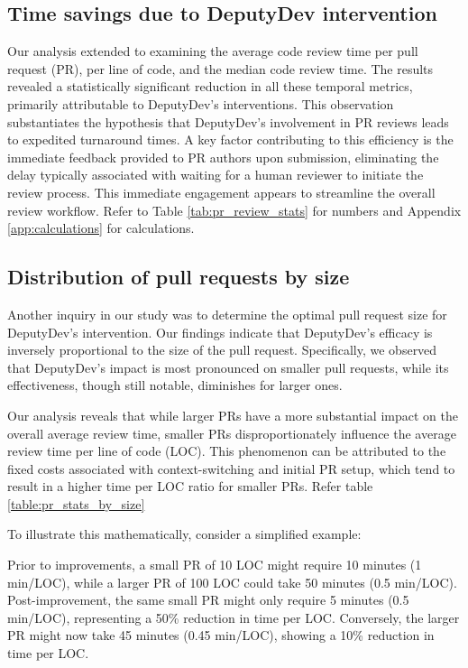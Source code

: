 \subsection{Time savings due to DeputyDev intervention}
Our analysis extended to examining the average code review time per pull request (PR), per line of code, and the median code review time. The results revealed a statistically significant reduction in all these temporal metrics, primarily attributable to DeputyDev's interventions. This observation substantiates the hypothesis that DeputyDev's involvement in PR reviews leads to expedited turnaround times. A key factor contributing to this efficiency is the immediate feedback provided to PR authors upon submission, eliminating the delay typically associated with waiting for a human reviewer to initiate the review process. This immediate engagement appears to streamline the overall review workflow. Refer to Table \ref{tab:pr_review_stats} for numbers and Appendix \ref{app:calculations} for calculations.






\subsection{Distribution of pull requests by size}
Another inquiry in our study was to determine the optimal pull request size for DeputyDev's intervention. Our findings indicate that DeputyDev's efficacy is inversely proportional to the size of the pull request. Specifically, we observed that DeputyDev's impact is most pronounced on smaller pull requests, while its effectiveness, though still notable, diminishes for larger ones.

Our analysis reveals that while larger PRs have a more substantial impact on the overall average review time, smaller PRs disproportionately influence the average review time per line of code (LOC). This phenomenon can be attributed to the fixed costs associated with context-switching and initial PR setup, which tend to result in a higher time per LOC ratio for smaller PRs. Refer table \ref{table:pr_stats_by_size}

To illustrate this mathematically, consider a simplified example:

Prior to improvements, a small PR of 10 LOC might require 10 minutes (1 min/LOC), while a larger PR of 100 LOC could take 50 minutes (0.5 min/LOC). Post-improvement, the same small PR might only require 5 minutes (0.5 min/LOC), representing a 50\% reduction in time per LOC. Conversely, the larger PR might now take 45 minutes (0.45 min/LOC), showing a 10\% reduction in time per LOC.

